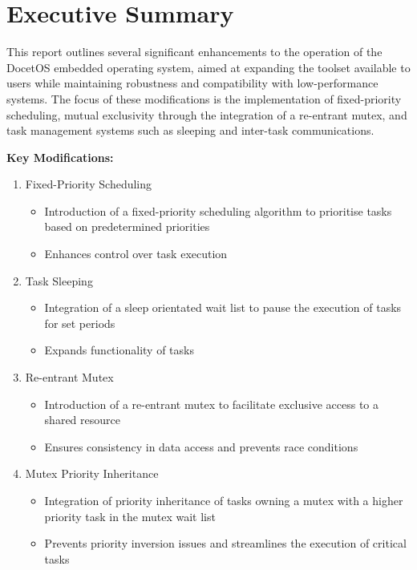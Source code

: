 \section{Executive Summary}
This report outlines several significant enhancements to the operation of the DocetOS embedded operating system, aimed at expanding the toolset available to users while maintaining robustness and compatibility with low-performance systems. The focus of these modifications is the implementation of fixed-priority scheduling, mutual exclusivity through the integration of a re-entrant mutex, and task management systems such as sleeping and inter-task communications. \hfill\break

\textbf{Key Modifications:}
\begin{enumerate}
	\item Fixed-Priority Scheduling
	\begin{itemize}
		\item Introduction of a fixed-priority scheduling algorithm to prioritise tasks based on predetermined priorities
		\item Enhances control over task execution
	\end{itemize}
	
	\item Task Sleeping
	\begin{itemize}
		\item Integration of a sleep orientated wait list to pause the execution of tasks for set periods
		\item Expands functionality of tasks
	\end{itemize}
	
	\item Re-entrant Mutex
	\begin{itemize}
		\item Introduction of a re-entrant mutex to facilitate exclusive access to a shared resource
		\item Ensures consistency in data access and prevents race conditions
	\end{itemize}
	
	\item Mutex Priority Inheritance
	\begin{itemize}
		\item Integration of priority inheritance of tasks owning a mutex with a higher priority task in the mutex wait list
		\item Prevents priority inversion issues and streamlines the execution of critical tasks
	\end{itemize}
	

\end{enumerate}
